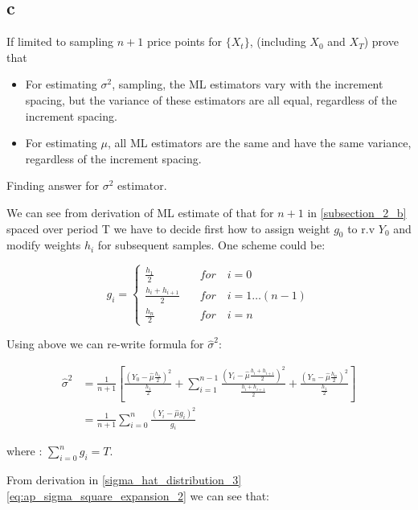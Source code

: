 \subsection{c}
If limited to sampling $n+1$ price points for $\{X_t\}$, (including $X_0$ and $X_T$) prove that
\begin{itemize}
	\item For estimating $\sigma^2$, sampling, the ML estimators vary with the increment spacing, but the variance of these estimators are all equal, regardless of the increment spacing.
	\item For estimating $\mu$, all ML estimators are the same and have the same variance, regardless of the increment spacing.
\end{itemize}

\begin{solution}
Finding answer for $\sigma^2$ estimator.

We can see from derivation of ML estimate of that for $n+1$ in \ref{subsection_2_b} 
spaced over period T we have to decide first how to assign weight $g_0$ to r.v $Y_0$ and modify weights $h_i$ for subsequent
samples. One scheme could be:

\begin{equation}
g_i = \left\{ 
\begin{aligned}
\frac{h_1}{2} \quad& for \quad i = 0 \\
\frac{h_i + h_{i+1}}{2} \quad& for \quad i = 1 \ldots (n-1) \\
\frac{h_n}{2} \quad& for \quad i = n 
\end{aligned}\right.
\end{equation}

Using above we can re-write formula for $\hat{\sigma}^2$:

\begin{equation}
\begin{aligned}
\hat{\sigma}^2  &= \frac{1}{n+1}\left[\frac{(Y_0-\hat{\mu} \frac{h_1}{2})^2}{\frac{h_1}{2}} 
												+ \sum_{i=1}^{n-1}\frac{(Y_i-\hat{\mu}\frac{h_i + h_{i+1}}{2})^2}{\frac{h_i + h_{i+1}}{2}}
												+ \frac{(Y_n-\hat{\mu} \frac{h_n}{2})^2}{\frac{h_1}{2}}\right] \\
								&= \frac{1}{n+1}\sum_{i=0}^{n}\frac{(Y_i-\hat{\mu} g_i)^2}{g_i}			
\end{aligned}
\end{equation}

where : $\sum_{i=0}^ng_i = T$.

From derivation in \ref{sigma_hat_distribution_3}\ref{eq:ap_sigma_square_expansion_2} we can see that: 


\end{solution}

